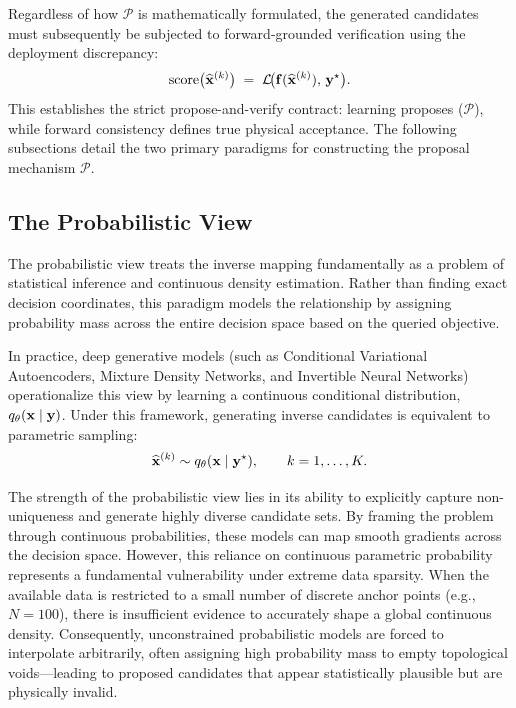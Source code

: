 Regardless of how $\mathcal{P}$ is mathematically formulated, the generated candidates must subsequently be subjected to forward-grounded verification using the deployment discrepancy:
\begin{equation}
  \text{score}\big(\widehat{\mathbf{x}}^{(k)}\big)
  \;=\;
  \mathcal{L}\!\big(\mathbf{f}(\widehat{\mathbf{x}}^{(k)}),\,\mathbf{y}^\star\big).
  \label{eq:verify_score_bg}
\end{equation}
This establishes the strict propose-and-verify contract: learning proposes ($\mathcal{P}$), while forward consistency defines true physical acceptance. The following subsections detail the two primary paradigms for constructing the proposal mechanism $\mathcal{P}$.


\subsection{The Probabilistic View}

The probabilistic view treats the inverse mapping fundamentally as a problem of statistical inference and continuous density estimation. Rather than finding exact decision coordinates, this paradigm models the relationship by assigning probability mass across the entire decision space based on the queried objective.

In practice, deep generative models (such as Conditional Variational Autoencoders, Mixture Density Networks, and Invertible Neural Networks) operationalize this view by learning a continuous conditional distribution, $q_\theta(\mathbf{x} \mid \mathbf{y})$. Under this framework, generating inverse candidates is equivalent to parametric sampling:
\begin{equation}
  \widehat{\mathbf{x}}^{(k)} \sim q_{\theta}(\mathbf{x}\mid\mathbf{y}^{\star}),\qquad k=1,\dots,K.
  \label{eq:prob_sampling}
\end{equation}

The strength of the probabilistic view lies in its ability to explicitly capture non-uniqueness and generate highly diverse candidate sets. By framing the problem through continuous probabilities, these models can map smooth gradients across the decision space. However, this reliance on continuous parametric probability represents a fundamental vulnerability under extreme data sparsity. When the available data is restricted to a small number of discrete anchor points (e.g., $N=100$), there is insufficient evidence to accurately shape a global continuous density. Consequently, unconstrained probabilistic models are forced to interpolate arbitrarily, often assigning high probability mass to empty topological voids—leading to proposed candidates that appear statistically plausible but are physically invalid.


